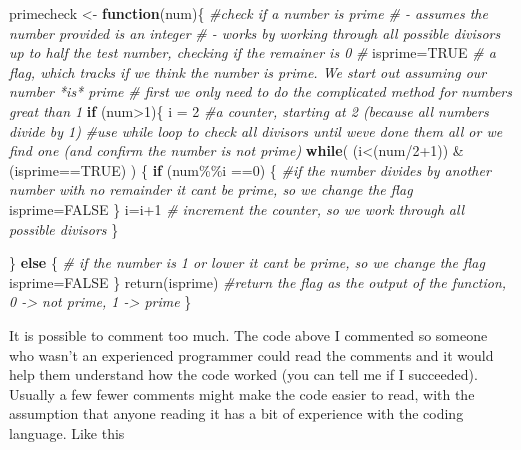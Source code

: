 \documentclass[
]{book}
\newenvironment{Shaded}{\begin{snugshade}}{\end{snugshade}}
\newcommand{\CommentTok}[1]{\textcolor[rgb]{0.56,0.35,0.01}{\textit{#1}}}
\newcommand{\ConstantTok}[1]{\textcolor[rgb]{0.00,0.00,0.00}{#1}}
\newcommand{\ControlFlowTok}[1]{\textcolor[rgb]{0.13,0.29,0.53}{\textbf{#1}}}
\newcommand{\DecValTok}[1]{\textcolor[rgb]{0.00,0.00,0.81}{#1}}
\newcommand{\FunctionTok}[1]{\textcolor[rgb]{0.00,0.00,0.00}{#1}}
\newcommand{\NormalTok}[1]{#1}
\newcommand{\OtherTok}[1]{\textcolor[rgb]{0.56,0.35,0.01}{#1}}
\newcommand{\SpecialCharTok}[1]{\textcolor[rgb]{0.00,0.00,0.00}{#1}}
\begin{document}
\begin{Shaded}
\begin{Highlighting}[]
\NormalTok{primecheck }\OtherTok{\textless{}{-}} \ControlFlowTok{function}\NormalTok{(num)\{}
  \CommentTok{\#check if a number is prime}
  \CommentTok{\# {-} assumes the number provided is an integer}
  \CommentTok{\# {-} works by working through all possible divisors up to half the test number, checking if the remainer is 0}
  \CommentTok{\#}
\NormalTok{  isprime}\OtherTok{=}\ConstantTok{TRUE} \CommentTok{\# a flag, which tracks if we think the number is prime. We start out assuming our number *is* prime}
  \CommentTok{\# first we only need to do the complicated method for numbers great than 1}
  \ControlFlowTok{if}\NormalTok{ (num}\SpecialCharTok{\textgreater{}}\DecValTok{1}\NormalTok{)\{ }
\NormalTok{    i }\OtherTok{=} \DecValTok{2} \CommentTok{\#a counter, starting at 2 (because all numbers divide by 1)}
      \CommentTok{\#use while loop to check all divisors until we\textquotesingle{}ve done them all or we find one (and confirm the number is not prime)}
\ControlFlowTok{while}\NormalTok{( (i}\SpecialCharTok{\textless{}}\NormalTok{(num}\SpecialCharTok{/}\DecValTok{2}\SpecialCharTok{+}\DecValTok{1}\NormalTok{)) }\SpecialCharTok{\&}\NormalTok{ (isprime}\SpecialCharTok{==}\ConstantTok{TRUE}\NormalTok{) ) \{}
  \ControlFlowTok{if}\NormalTok{ (num}\SpecialCharTok{\%\%}\NormalTok{i }\SpecialCharTok{==}\DecValTok{0}\NormalTok{) \{}
    \CommentTok{\#if the number divides by another number with no remainder it can\textquotesingle{}t be prime, so we change the flag}
\NormalTok{    isprime}\OtherTok{=}\ConstantTok{FALSE}
\NormalTok{  \}}
\NormalTok{  i}\OtherTok{=}\NormalTok{i}\SpecialCharTok{+}\DecValTok{1} \CommentTok{\# increment the counter, so we work through all possible divisors}
\NormalTok{\}}

\NormalTok{\} }\ControlFlowTok{else}\NormalTok{ \{}
  \CommentTok{\# if the number is 1 or lower it can\textquotesingle{}t be prime, so we change the flag}
\NormalTok{  isprime}\OtherTok{=}\ConstantTok{FALSE}
\NormalTok{\}}
\FunctionTok{return}\NormalTok{(isprime) }\CommentTok{\#return the flag as the output of the function, 0 {-}\textgreater{} not prime, 1 {-}\textgreater{} prime}
\NormalTok{\}}
\end{Highlighting}
\end{Shaded}

It is possible to comment too much. The code above I commented so someone who wasn't an experienced programmer could read the comments and it would help them understand how the code worked (you can tell me if I succeeded). Usually a few fewer comments might make the code easier to read, with the assumption that anyone reading it has a bit of experience with the coding language. Like this
\end{document}
